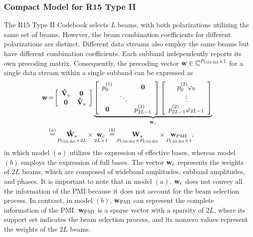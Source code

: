 \documentclass[lettersize,journal]{IEEEtran}
\begin{document}
\subsubsection{Compact Model for R15 Type II}
The R15 Type II Codebook selects \( L \) beams, with both polarizations utilizing the same set of beams. However, the beam combination coefficients for different polarizations are distinct. Different data streams also employ the same beams but have different combination coefficients. Each subband independently reports its own precoding matrix. Consequently, the precoding vector $ {\bf{w}} \in \mathbb{C}^{{P_{{\text{CSI-RS}}}}\times 1}$ for a single data stream within a single subband can be expressed as
\begin{align}
{\bf{w}} & \!=\! \left[ {\begin{array}{*{20}{c}}
{{{{\bf{\hat V}}}_s}}&{\bf{0}}\\
{\bf{0}}&{{{{\bf{\hat V}}}_s}}
\end{array}} \right]\underbrace {\left[ {\begin{array}{*{20}{c}}
{p_0^{(1)}}&{}&{\bf{0}}\\
{}& \ddots &{}\\
{\bf{0}}&{}&{{p_{2L - 1}^{(1)}}}
\end{array}} \right]\left[ {\begin{array}{*{20}{c}}
{p_0^{(2)}{\varphi _0}}\\
 \vdots \\
{p_{2L - 1}^{(2)}{\varphi _{2L - 1}}}
\end{array}} \right]}_{{{\bf{w}}_c}} \notag\\
& \mathop  = \limits^{(a)} \mathop {{{{\bf{\hat W}}}_s}}\limits_{{P_{{\text{CSI-RS}}}} \times 2L} \times \mathop {{{\bf{w}}_c}}\limits_{2L \times 1} \mathop  = \limits^{(b)} \mathop {{{\bf{W}}_s}}\limits_{{P_{{\text{CSI-RS}}}} \times {P_{{\text{CSI-RS}}}}} \times \mathop {{{\bf{w}}_{{\text{PMI}}}}}\limits_{{P_{{\text{CSI-RS}}}} \times 1} ,
\end{align}  
in which model $(a)$ utilizes the expression of effective bases, whereas model $(b)$ employs the expression of full bases. The vector \( {\bf{w}}_c \) represents the weights of \( 2L \) beams, which are composed of wideband amplitudes, subband amplitudes, and phases. It is important to note that in model $(a)$, \( {\bf{w}}_c \) does not convey all the information of the PMI because it does not account for the beam selection process. In contrast, in model $(b)$, \( {\bf{w}}_{\rm{PMI}} \) can represent the complete information of the PMI. \( {\bf{w}}_{\rm{PMI}} \) is a sparse vector with a sparsity of \( 2L \), where its support set indicates the beam selection process, and its nonzero values represent the weights of the \( 2L \) beams.
\end{document}
